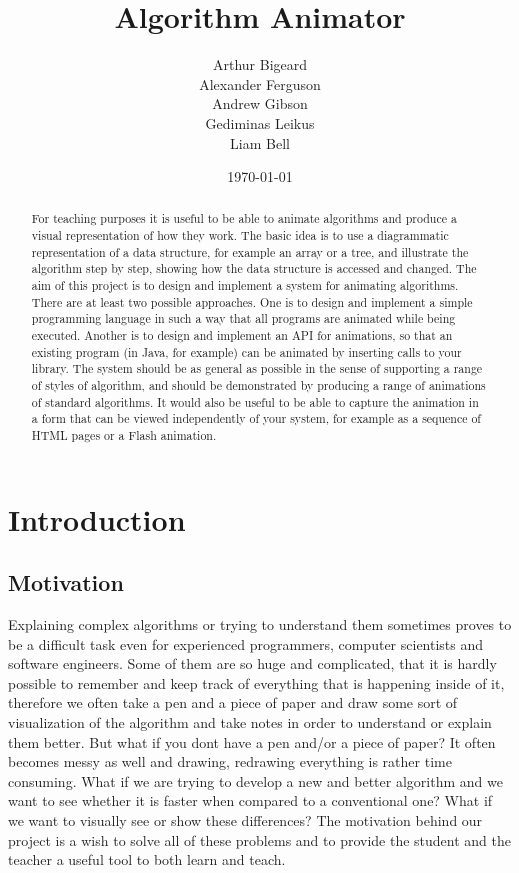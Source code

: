 \documentclass{l3proj}
\begin{document}
\title{Algorithm Animator}
\author{Arthur Bigeard \\
		Alexander Ferguson \\
		Andrew Gibson \\
		Gediminas Leikus \\
		Liam Bell}
\usdate
\date{\today}
\maketitle
\begin{abstract}

For teaching purposes it is useful to be able to animate algorithms and produce a visual representation of how they work. The basic idea is to use a diagrammatic representation of a data structure, for example an array or a tree, and illustrate the algorithm step by step, showing how the data structure is accessed and changed. The aim of this project is to design and implement a system for animating algorithms. There are at least two possible approaches. One is to design and implement a simple programming language in such a way that all programs are animated while being executed. Another is to design and implement an API for animations, so that an existing program (in Java, for example) can be animated by inserting calls to your library. The system should be as general as possible in the sense of supporting a range of styles of algorithm, and should be demonstrated by producing a range of animations of standard algorithms. It would also be useful to be able to 
capture the animation in a form that can be viewed independently of your system, for example as a sequence of HTML pages or a Flash animation.

\end{abstract}
\educationalconsent
\tableofcontents
\chapter{Introduction}
\label{intro}

\section{Motivation}
Explaining complex algorithms or trying to understand them sometimes proves to be a difficult task even for experienced programmers, computer scientists and software engineers. Some of them are so huge and complicated, that it is hardly possible to remember and keep track of everything that is happening inside of it, therefore we often take a pen and a piece of paper and draw some sort of visualization of the algorithm and take notes in order to understand or explain them better. But what if you dont have a pen and/or a piece of paper? It often becomes messy as well and drawing, redrawing everything is rather time consuming. What if we are trying to develop a new and better algorithm and we want to see whether it is faster when compared to a conventional one? What if we want to visually see or show these differences? The motivation behind our project is a wish to solve all of these problems and to provide the student and the teacher a useful tool to both learn and teach. 
\end{document}
